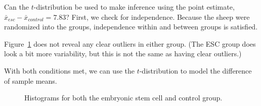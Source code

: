 \D{\newpage}

\begin{examplewrap}
\begin{nexample}{Can the $t$-distribution be used to make
    inference using the point estimate,
    $\bar{x}_{esc} - \bar{x}_{control} = 7.83$?}
  First, we check for independence.
  Because the sheep were randomized into
  the groups, independence within
  and between groups is satisfied.

  Figure~\ref{stemCellTherapyForHearts}
  does not reveal any clear outliers
  in either group.
  (The ESC group does look a bit more variability,
  but this is not the same as having clear outliers.)

  With both conditions met, we can use the
  $t$-distribution to model the difference of sample means.
\end{nexample}
\end{examplewrap}

\begin{figure}[h]
  \centering
  \caption{Histograms for both the embryonic stem cell
      and control group.}
  \label{stemCellTherapyForHearts}
\end{figure}


%

